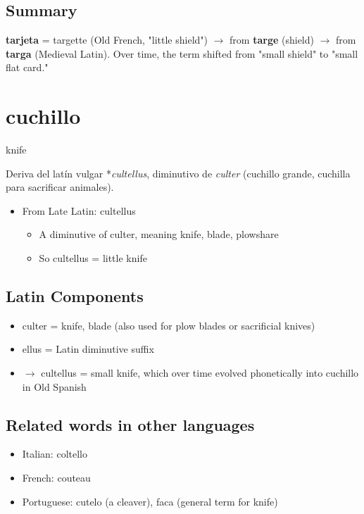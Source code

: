 \documentclass[10pt]{book}
\newcommand{\wordentry}[2]{
	\large #1
	\vspace{-0.5em}
	\begin{etymologybox}
		#2
	\end{etymologybox}
}
\let\oldsection\section
\renewcommand{\section}[1]{
	\needspace{8\baselineskip}
	\oldsection{#1}
}
\begin{document}
	\subsection*{Summary}
	
	\textbf{tarjeta} = targette (Old French, "little shield") $\rightarrow$ from \textbf{targe} (shield) $\rightarrow$ from \textbf{targa} (Medieval Latin).
	Over time, the term shifted from "small shield" to "small flat card."
	
	
	\section{cuchillo}
	
	\wordentry{knife}{
	Deriva del latín vulgar *\textit{cultellus}, diminutivo de \textit{culter} (cuchillo grande, cuchilla para sacrificar animales).
	\begin{itemize}
		\item From Late Latin: cultellus
		\begin{itemize}
			\item A diminutive of culter, meaning knife, blade, plowshare
			\item So cultellus = little knife
		\end{itemize}
	\end{itemize}
	}
	
	\subsection*{Latin Components}
	
	\begin{itemize}
		\item culter = knife, blade (also used for plow blades or sacrificial knives)
		
		\item ellus = Latin diminutive suffix
		
		\item $\rightarrow$ cultellus = small knife, which over time evolved phonetically into cuchillo in Old Spanish
	\end{itemize}
	
	\subsection*{Related words in other languages}
	\begin{itemize}
		\item Italian: coltello
		\item French: couteau
		\item Portuguese: cutelo (a cleaver), faca (general term for knife)
	\end{itemize}
	
\end{document}
